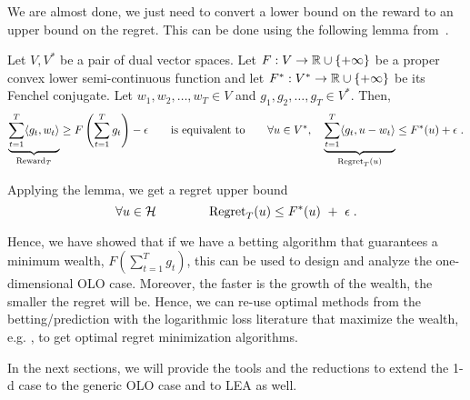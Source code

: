 We are almost done, we just need to convert a lower bound on the reward to an
upper bound on the regret. This can be done using the following lemma
from~\cite{McMahan-Orabona-2014}.
\begin{lemma}
\label{lemma:reward-regret}
Let $V,V^*$ be a pair of dual vector spaces. Let $F:V \to \mathbb{R} \cup \{+\infty\}$
be a proper convex lower semi-continuous function and let $F^*:V^* \to \mathbb{R} \cup
\{+\infty\}$ be its Fenchel conjugate. Let $w_1, w_2, \dots, w_T \in V$ and
$g_1, g_2, \dots, g_T \in V^*$.  Then,
\[
\underbrace{\sum_{t=1}^T \langle g_t, w_t \rangle}_{\operatorname{Reward}_T} \ge F\left( \sum_{t=1}^T g_t \right) -\epsilon
\qquad \text{is equivalent to} \qquad
\forall u \in V^*, \quad
\underbrace{\sum_{t=1}^T \langle g_t, u - w_t\rangle}_{\operatorname{Regret}_T(u)} \le F^*(u) + \epsilon\; .
\]
\end{lemma}
\vspace{-.1cm}
Applying the lemma, we get a regret upper bound
\[
\forall u \in \mathcal{H} \qquad \qquad
\operatorname{Regret}_T(u) \le F^*(u) \ + \ \epsilon \; .
\]

Hence, we have showed that if we have a betting algorithm that guarantees a
minimum wealth, $F(\sum_{t=1}^T g_t)$, this can be used to design and analyze
the one-dimensional \ac{OLO} case. Moreover, the faster is the growth of the wealth, the
smaller the regret will be.  
Hence, we can re-use optimal methods from the betting/prediction with the logarithmic loss literature that maximize the wealth, e.g. \cite[Section 9]{Cesa-Bianchi-Lugosi-2006}, to get optimal regret minimization algorithms.

In the next sections, we will provide the tools and the reductions to extend the 1-d case to the generic \ac{OLO} case and
to \ac{LEA} as well.
